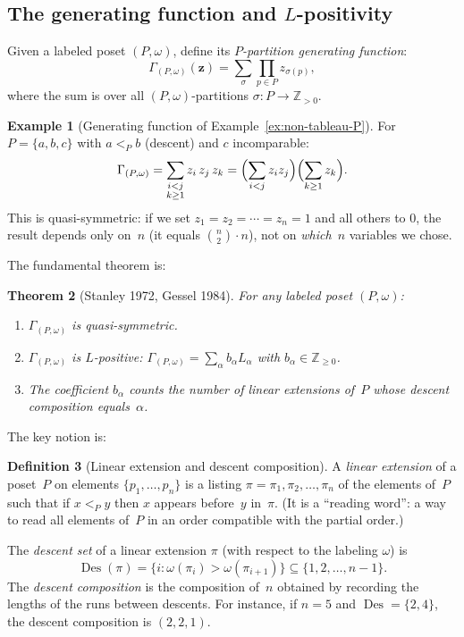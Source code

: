 \documentclass[11pt]{article}
\theoremstyle{plain}
\newtheorem{theorem}{Theorem}[section]
\theoremstyle{definition}
\newtheorem{definition}[theorem]{Definition}
\newtheorem{example}[theorem]{Example}
\theoremstyle{remark}
\newcommand{\Z}{\mathbb{Z}}
\newcommand{\Des}{\operatorname{Des}}
\begin{document}
\subsection{The generating function and $L$-positivity}
\label{sec:P-part-gf}

Given a labeled poset $(P,\omega)$, define its
\emph{$P$-partition generating function}:
\[
  \Gamma_{(P,\omega)}(\mathbf{z})
  = \sum_\sigma \prod_{p \in P} z_{\sigma(p)},
\]
where the sum is over all $(P,\omega)$-partitions
$\sigma : P \to \Z_{>0}$.

\begin{example}[Generating function of Example~\ref{ex:non-tableau-P}]
\label{ex:P-gf}
For $P = \{a, b, c\}$ with $a <_P b$ (descent) and
$c$ incomparable:
\[
  \Gamma_{(P,\omega)}
  = \sum_{\substack{i < j \\ k \geq 1}} z_i\, z_j\, z_k
  = \Bigl(\sum_{i < j} z_i z_j\Bigr)
    \Bigl(\sum_{k \geq 1} z_k\Bigr).
\]
This is quasi-symmetric: if we set $z_1 = z_2 = \cdots = z_n = 1$
and all others to $0$, the result depends only on~$n$
(it equals $\binom{n}{2} \cdot n$), not on \emph{which}~$n$
variables we chose.
\end{example}

The fundamental theorem is:

\begin{theorem}[Stanley 1972, Gessel 1984]
\label{thm:P-part-qsym-full}
For any labeled poset $(P,\omega)$:
\begin{enumerate}
\item $\Gamma_{(P,\omega)}$ is quasi-symmetric.
\item $\Gamma_{(P,\omega)}$ is $L$-positive:
  $\Gamma_{(P,\omega)} = \sum_\alpha b_\alpha L_\alpha$
  with $b_\alpha \in \Z_{\geq 0}$.
\item The coefficient $b_\alpha$ counts the number of
  \emph{linear extensions} of~$P$ whose \emph{descent
  composition} equals~$\alpha$.
\end{enumerate}
\end{theorem}

The key notion is:

\begin{definition}[Linear extension and descent composition]
\label{def:linear-ext}
A \emph{linear extension} of a poset~$P$ on elements
$\{p_1, \ldots, p_n\}$
is a listing $\pi = \pi_1, \pi_2, \ldots, \pi_n$ of the
elements of~$P$ such that if $x <_P y$ then $x$ appears
before~$y$ in~$\pi$.  (It is a ``reading word'': a way to read
all elements of~$P$ in an order compatible with the
partial order.)

The \emph{descent set} of a linear extension $\pi$ (with
respect to the labeling $\omega$) is
\[
  \Des(\pi) = \{i : \omega(\pi_i) > \omega(\pi_{i+1})\}
  \subseteq \{1, 2, \ldots, n{-}1\}.
\]
The \emph{descent composition} is the composition of~$n$
obtained by recording the lengths of the runs between descents.
For instance, if $n = 5$ and $\Des = \{2, 4\}$,
the descent composition is $(2, 2, 1)$.
\end{definition}
\end{document}
